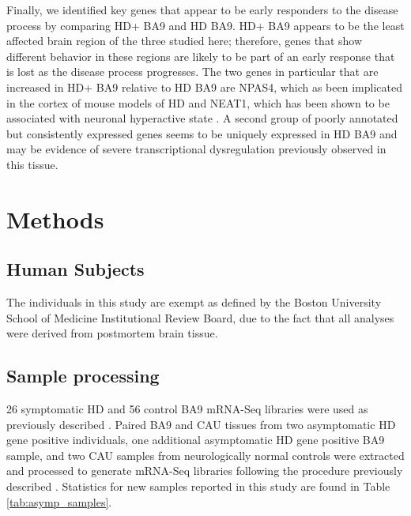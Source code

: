 \documentclass[fleqn,10pt,table]{wlscirep}
\begin{document}
Finally, we identified key genes that appear to be early responders to the disease process by comparing HD+ BA9 and HD BA9.
HD+ BA9 appears to be the least affected brain region of the three studied here; therefore, genes that show different behavior in these regions are likely to be part of an early response that is lost as the disease process progresses.
The two genes in particular that are increased in HD+ BA9 relative to HD BA9 are NPAS4, which as been implicated in the cortex of mouse models of HD \cite{Vashishtha2013-su} and NEAT1, which has been shown to be associated with neuronal hyperactive state \cite{Barry2017-it}.
A second group of poorly annotated but consistently expressed genes seems to be uniquely expressed in HD BA9 and may be evidence of severe transcriptional dysregulation previously observed in this tissue.
 
\section{Methods}

\subsection{Human Subjects}
The individuals in this study are exempt as defined by the Boston University School of Medicine Institutional Review Board, due to the fact that all analyses were derived from postmortem brain tissue.

\subsection{Sample processing}
26 symptomatic HD and 56 control BA9 mRNA-Seq libraries were used as previously described \cite{Labadorf2017-qb}.
Paired BA9 and CAU tissues from two asymptomatic HD gene positive individuals, one additional asymptomatic HD gene positive BA9 sample, and two CAU samples from neurologically normal controls were extracted and processed to generate mRNA-Seq libraries following the procedure previously described \cite{Labadorf2017-qb}.
Statistics for new samples reported in this study are found in Table \ref{tab:asymp_samples}.
\end{document}
